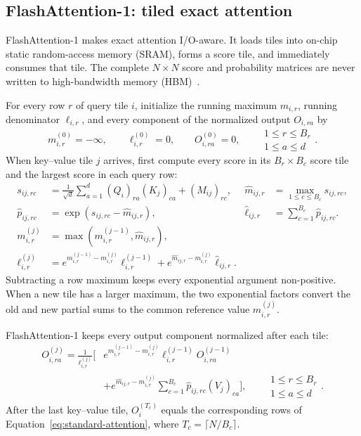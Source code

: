 \documentclass[11pt]{article}
\numberwithin{equation}{section}
\begin{document}
\subsection{FlashAttention-1: tiled exact attention}
\label{sec:fa1}

FlashAttention-1 makes exact attention I/O-aware.  It loads tiles into on-chip
static random-access memory (SRAM), forms a score tile, and immediately consumes
that tile.  The complete $N\times N$ score and probability matrices are never
written to high-bandwidth memory (HBM)~\cite{dao2022flashattention}.

For every row $r$ of query tile $i$, initialize the running maximum
$m_{i,r}$, running denominator $\ell_{i,r}$, and every component of the
normalized output $O_{i,ra}$ by
\begin{equation}
  m_{i,r}^{(0)}=-\infty,
  \qquad \ell_{i,r}^{(0)}=0,
  \qquad O_{i,ra}^{(0)}=0,
  \qquad
  \substack{1\le r\le B_r\\1\le a\le d}.
  \label{eq:fa1-initial-state}
\end{equation}
When key--value tile $j$ arrives, first compute every score in its
$B_r\times B_c$ score tile and the largest score in each query row:
\begin{align}
  s_{ij,rc}
  &=\frac{1}{\sqrt d}\sum_{a=1}^{d}
      (Q_i)_{ra}(K_j)_{ca}+(M_{ij})_{rc},
  &\widehat m_{ij,r}
  &=\max_{1\le c\le B_c}s_{ij,rc},
  \label{eq:fa1-score}\\
  \widehat p_{ij,rc}
  &=\exp\!\left(s_{ij,rc}-\widehat m_{ij,r}\right),
  &\widehat\ell_{ij,r}
  &=\sum_{c=1}^{B_c}\widehat p_{ij,rc}.
  \label{eq:fa1-local-softmax}\\
  m_{i,r}^{(j)}
  &=\max\!\left(m_{i,r}^{(j-1)},\widehat m_{ij,r}\right),
  \label{eq:fa1-new-maximum}\\
  \ell_{i,r}^{(j)}
  &=e^{m_{i,r}^{(j-1)}-m_{i,r}^{(j)}}\ell_{i,r}^{(j-1)}
    +e^{\widehat m_{ij,r}-m_{i,r}^{(j)}}\widehat\ell_{ij,r}.
  \label{eq:fa1-new-denominator}
\end{align}
Subtracting a row maximum keeps every exponential argument non-positive.  When a
new tile has a larger maximum, the two exponential factors convert the old and
new partial sums to the common reference value $m_{i,r}^{(j)}$.

FlashAttention-1 keeps every output component normalized after each tile:
\begin{align}
  O_{i,ra}^{(j)}
  =\frac{1}{\ell_{i,r}^{(j)}}\Biggl[
    &e^{m_{i,r}^{(j-1)}-m_{i,r}^{(j)}}
      \ell_{i,r}^{(j-1)}O_{i,ra}^{(j-1)}
  \nonumber\\
    &+e^{\widehat m_{ij,r}-m_{i,r}^{(j)}}
      \sum_{c=1}^{B_c}\widehat p_{ij,rc}(V_j)_{ca}
  \Biggr],
  \qquad
  \substack{1\le r\le B_r\\1\le a\le d}.
  \label{eq:fa1-output-update}
\end{align}
After the last key--value tile, $O_i^{(T_c)}$ equals the corresponding rows of
Equation~\eqref{eq:standard-attention}, where $T_c=\lceil N/B_c\rceil$.
\end{document}
